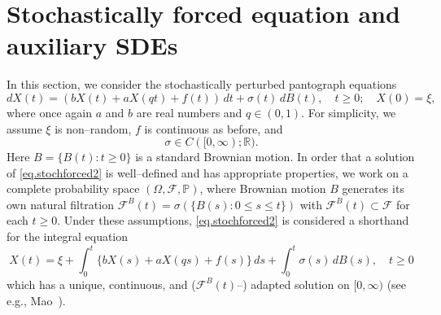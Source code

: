 \documentclass[a4paper,10pt,reqno]{amsart}
\numberwithin{equation}{section}
\theoremstyle{definition}
\theoremstyle{remark}
\DeclareMathOperator{\1}{\mathbbm 1}
\begin{document}
\section{Stochastically forced equation and auxiliary SDEs}
In this section, we consider the stochastically perturbed pantograph equations
\begin{equation} \label{eq.stochforced2}
dX(t)=(bX(t)+aX(qt)+f(t))\,dt + \sigma(t)\,dB(t), \quad t\geq 0; \quad X(0)=\xi,
\end{equation}
where once again $a$ and $b$ are real numbers and $q\in (0,1)$. For simplicity, we assume $\xi$ is non--random, $f$ is continuous as before, and   
\begin{equation} \label{eq.sigma}
\sigma\in C([0,\infty);\mathbb{R}).
\end{equation}
Here $B=\{B(t):t\geq 0\}$ is a standard Brownian motion. In order that a solution of \eqref{eq.stochforced2} is well--defined and has appropriate properties, we work on a complete probability space $(\Omega,\mathcal{F},\mathbb{P})$, where Brownian motion $B$ generates its own natural filtration $\mathcal{F}^B(t)=\sigma(\{B(s):0\leq s\leq t\})$ with  $\mathcal{F}^B(t)\subset \mathcal{F}$ for each $t\geq 0$. Under these assumptions, \eqref{eq.stochforced2} is considered a shorthand for the integral equation 
\[
X(t)=\xi+\int_{0}^t \{bX(s)+aX(qs) +f(s)\}\,ds + \int_0^t \sigma(s)\,dB(s), \quad t\geq 0
\]
which has a unique, continuous, and ($\mathcal{F}^B(t)$--) adapted solution on $[0,\infty)$ (see e.g., Mao~\cite{MaoBK}). 
\end{document}
